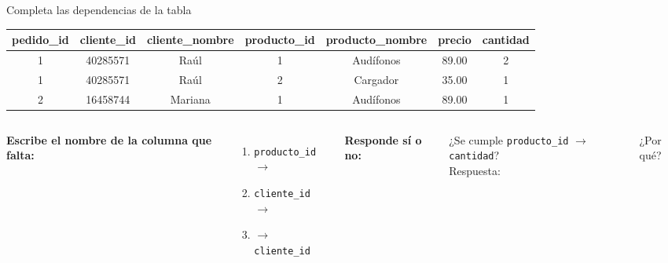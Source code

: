 \documentclass[aspectratio=169,10pt,c]{beamer}
\newcommand{\fdep}{$\rightarrow$}
\newcommand{\bl}[1][1.9cm]{\underline{\hspace{#1}}}
\newenvironment{tablaventa}{\footnotesize\setlength\tabcolsep{4.5pt}}{}
\begin{document}
\begin{frame}{Completa las dependencias de la tabla}
\begin{center}
\begin{tablaventa}
\begin{tabular}{ccccccc}
\toprule
\bfseries pedido\_id & \bfseries cliente\_id & \bfseries cliente\_nombre & \bfseries producto\_id & \bfseries producto\_nombre & \bfseries precio & \bfseries cantidad \\
\midrule
1 & 40285571 & Raúl    & 1 & Audífonos & 89.00 & 2 \\
1 & 40285571 & Raúl    & 2 & Cargador  & 35.00 & 1 \\
2 & 16458744 & Mariana & 1 & Audífonos & 89.00 & 1 \\
\bottomrule
\end{tabular}
\end{tablaventa}
\end{center}
\vspace{0.35cm}
\begin{columns}[T,onlytextwidth]
\small \textbf{Escribe el nombre de la columna que falta:}
\begin{enumerate}\setlength\itemsep{7pt}\small
  \item \texttt{producto\_id} \fdep{} \bl
  \item \texttt{cliente\_id} \fdep{} \bl
  \item \bl{} \fdep{} \texttt{cliente\_id}
\end{enumerate}
\small \textbf{Responde sí o no:}
\vspace{4pt}

\small ¿Se cumple \texttt{producto\_id} \fdep{} \texttt{cantidad}?\\[5pt]
Respuesta: \bl[1.6cm]
\vspace{7pt}

\small ¿Por qué? \bl[3cm]
\end{columns}
\end{frame}
\end{document}
